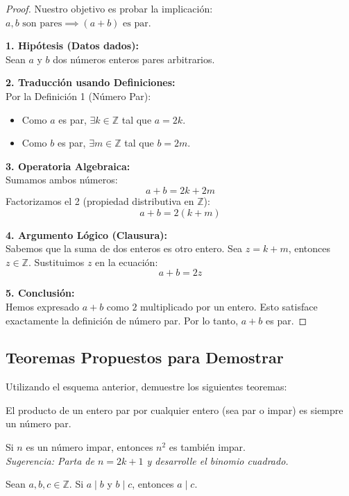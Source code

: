 \begin{proof}
Nuestro objetivo es probar la implicación: $a, b \text{ son pares} \implies (a+b) \text{ es par}$.

\textbf{1. Hipótesis (Datos dados):} \\
Sean $a$ y $b$ dos números enteros pares arbitrarios.

\textbf{2. Traducción usando Definiciones:} \\
Por la Definición 1 (Número Par):
\begin{itemize}
    \item Como $a$ es par, $\exists k \in \mathbb{Z}$ tal que $a = 2k$.
    \item Como $b$ es par, $\exists m \in \mathbb{Z}$ tal que $b = 2m$.
\end{itemize}

\textbf{3. Operatoria Algebraica:} \\
Sumamos ambos números:
\[ a + b = 2k + 2m \]
Factorizamos el 2 (propiedad distributiva en $\mathbb{Z}$):
\[ a + b = 2(k + m) \]

\textbf{4. Argumento Lógico (Clausura):} \\
Sabemos que la suma de dos enteros es otro entero. Sea $z = k + m$, entonces $z \in \mathbb{Z}$.
Sustituimos $z$ en la ecuación:
\[ a + b = 2z \]

\textbf{5. Conclusión:} \\
Hemos expresado $a+b$ como $2$ multiplicado por un entero. Esto satisface exactamente la definición de número par. Por lo tanto, $a+b$ es par.
\end{proof}

\subsection{Teoremas Propuestos para Demostrar}

Utilizando el esquema anterior, demuestre los siguientes teoremas:

\begin{teorema}
El producto de un entero par por cualquier entero (sea par o impar) es siempre un número par.
\end{teorema}

\begin{teorema}
Si $n$ es un número impar, entonces $n^2$ es también impar. \\
\textit{Sugerencia: Parta de $n=2k+1$ y desarrolle el binomio cuadrado.}
\end{teorema}

\begin{teorema}
Sean $a, b, c \in \mathbb{Z}$. Si $a \mid b$ y $b \mid c$, entonces $a \mid c$.
\end{teorema}